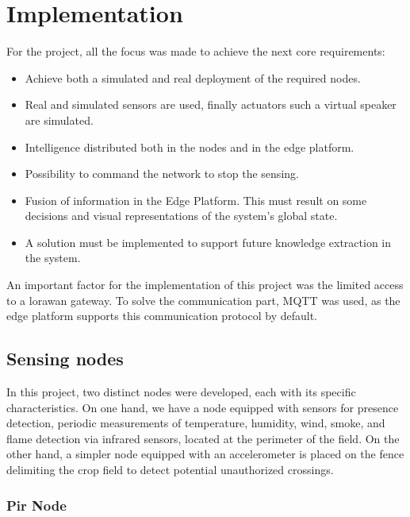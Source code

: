 \section{Implementation}

For the project, all the focus was made to achieve the next core requirements:
\begin{itemize}
    \item Achieve both a simulated and real deployment of the required nodes.
    \item Real and simulated sensors are used, finally actuators such a virtual speaker are simulated.
    \item Intelligence distributed both in the nodes and in the edge platform.
    \item Possibility to command the network to stop the sensing.
    \item Fusion of information in the Edge Platform. This must result on some decisions and visual representations of the system's global state.
    \item A solution must be implemented to support future knowledge extraction in the system.
\end{itemize}

An important factor for the implementation of this project was the limited access to a \acrshort{lorawan} gateway. To solve the communication part, MQTT was used, as the edge 
platform supports this communication protocol by default.

\subsection{Sensing nodes}

In this project, two distinct nodes were developed, each with its specific characteristics. On one hand, we have a node equipped with sensors for presence detection, 
periodic measurements of temperature, humidity, wind, smoke, and flame detection via infrared sensors, located at the perimeter of the field. On the other hand, a 
simpler node equipped with an accelerometer is placed on the fence delimiting the crop field to detect potential unauthorized crossings.

\subsubsection*{Pir Node}


